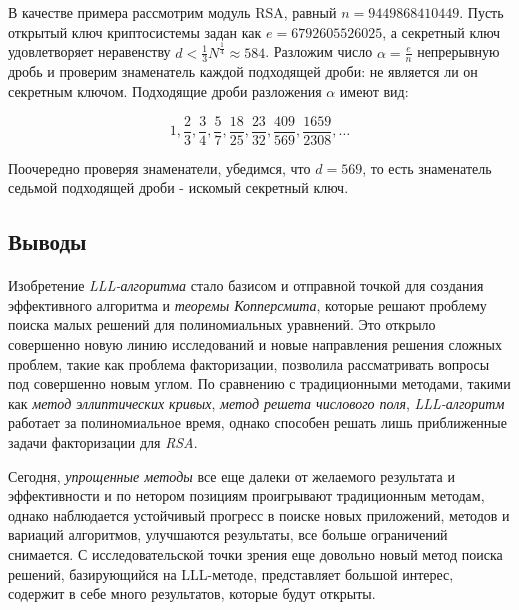   \begin{example}
    В качестве примера рассмотрим модуль RSA, равный $n = 9449868410449$. Пусть открытый ключ криптосистемы задан как $e = 6792605526025$,
    а секретный ключ удовлетворяет неравенству $d < \frac{1}{3} N^{\frac{1}{4}} \approx 584$. Разложим число $ \alpha = \frac{e}{n} $ непрерывную дробь и проверим 
    знаменатель каждой подходящей дроби: не является ли он секретным ключом. Подходящие дроби разложения $ \alpha $ имеют вид:
    
      \begin{equation}
	        1, \frac{2}{3}, \frac{3}{4}, \frac{5}{7}, \frac{18}{25}, \frac{23}{32}, \frac{409}{569}, \frac{1659}{2308}, \dots
      \end{equation}

    Поочередно проверяя знаменатели, убедимся, что $d = 569$, то есть знаменатель седьмой подходящей дроби - искомый секретный ключ.
  \end{example}
  
  
\subsection{Выводы}

\paragraph{} Изобретение \textit{LLL-алгоритма} стало базисом и отправной точкой для создания эффективного алгоритма и \textit{теоремы Копперсмита}, которые
  решают проблему поиска малых решений для полиномиальных уравнений. Это открыло совершенно новую линию исследований и новые направления решения
  сложных проблем, такие как проблема факторизации, позволила рассматривать вопросы под совершенно новым углом. По сравнению с
  традиционными методами, такими как \textit{метод эллиптических кривых}, \textit{метод решета числового поля}, \textit{LLL-алгоритм} работает за полиномиальное время,
  однако способен решать лишь приближенные задачи факторизации для \textit{RSA}.
  
  Сегодня, \textit{упрощенные методы} все еще далеки от желаемого результата и эффективности и по нетором позициям проигрывают традиционным методам,
  однако наблюдается устойчивый прогресс в поиске новых приложений, методов и вариаций алгоритмов, улучшаются результаты, все больше ограничений
  снимается. С исследовательской точки зрения еще довольно новый метод поиска решений, базирующийся на LLL-методе, представляет большой интерес,
  содержит в себе много результатов, которые будут открыты.
  
